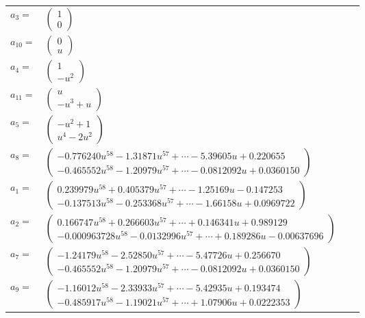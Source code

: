 \documentclass[1p]{elsarticle_modified}
\theoremstyle{definition}
\begin{document}
\begin{tabular}{m{7pt} m{180pt} m{7pt} m{180pt} }
\flushright $a_{3}=$&$\begin{pmatrix}1\\0\end{pmatrix}$ \\
\flushright $a_{10}=$&$\begin{pmatrix}0\\u\end{pmatrix}$ \\
\flushright $a_{4}=$&$\begin{pmatrix}1\\- u^2\end{pmatrix}$ \\
\flushright $a_{11}=$&$\begin{pmatrix}u\\- u^3+u\end{pmatrix}$ \\
\flushright $a_{5}=$&$\begin{pmatrix}- u^2+1\\u^4-2 u^2\end{pmatrix}$ \\
\flushright $a_{8}=$&$\begin{pmatrix}-0.776240 u^{58}-1.31871 u^{57}+\cdots-5.39605 u+0.220655\\-0.465552 u^{58}-1.20979 u^{57}+\cdots-0.0812092 u+0.0360150\end{pmatrix}$ \\
\flushright $a_{1}=$&$\begin{pmatrix}0.239979 u^{58}+0.405379 u^{57}+\cdots-1.25169 u-0.147253\\-0.137513 u^{58}-0.253368 u^{57}+\cdots-1.66158 u+0.0969722\end{pmatrix}$ \\
\flushright $a_{2}=$&$\begin{pmatrix}0.166747 u^{58}+0.266603 u^{57}+\cdots+0.146341 u+0.989129\\-0.000963728 u^{58}-0.0132996 u^{57}+\cdots+0.189286 u-0.00637696\end{pmatrix}$ \\
\flushright $a_{7}=$&$\begin{pmatrix}-1.24179 u^{58}-2.52850 u^{57}+\cdots-5.47726 u+0.256670\\-0.465552 u^{58}-1.20979 u^{57}+\cdots-0.0812092 u+0.0360150\end{pmatrix}$ \\
\flushright $a_{9}=$&$\begin{pmatrix}-1.16012 u^{58}-2.33933 u^{57}+\cdots-5.42935 u+0.193474\\-0.485917 u^{58}-1.19021 u^{57}+\cdots+1.07906 u+0.0222353\end{pmatrix}$ \\

\end{tabular}
\end{document}

